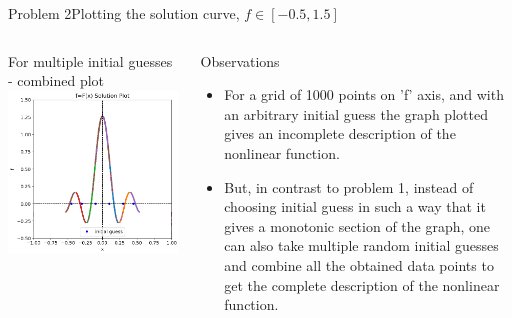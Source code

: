\documentclass{beamer}
\begin{document}
\begin{frame}{Problem 2}{Plotting the solution curve, $f\in[-0.5,1.5]$}
    \vspace{-2.5em}
    \begin{columns}
        \begin{block}{\scriptsize For multiple initial guesses - combined plot }
            \includegraphics[width=\textwidth]{Figures/prob2_pltsol2.png}
        \end{block}
        \begin{block}{\footnotesize Observations }
            \footnotesize
            \begin{itemize}
                \item For a grid of 1000 points on 'f' axis, and with an arbitrary initial guess the graph plotted gives an incomplete description of the nonlinear function.
                \item But, in contrast to problem 1, instead of choosing initial guess in such a way that it gives a monotonic section of the graph, one can also take multiple random initial guesses and combine all the obtained data points to get the complete description of the nonlinear function.
            \end{itemize}
        \end{block}
    \end{columns}
\end{frame}
\end{document}
